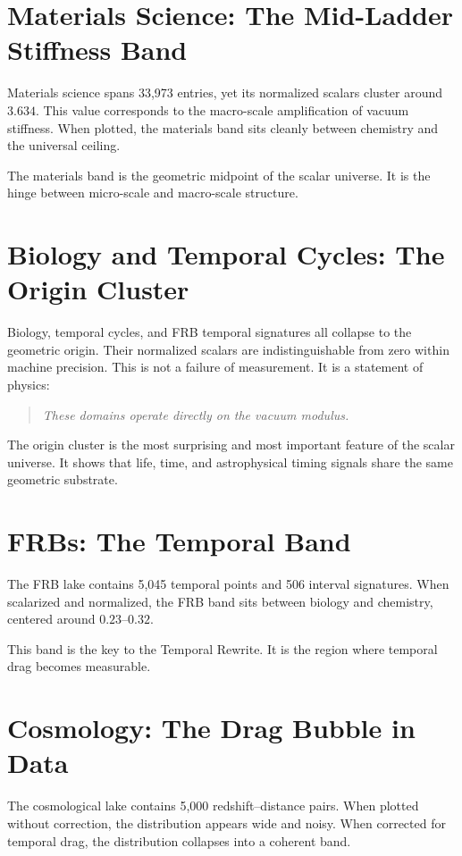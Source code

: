 \documentclass[11pt, letterpaper, openany]{book}
\begin{document}
\section*{Materials Science: The Mid-Ladder Stiffness Band}
Materials science spans 33,973 entries, yet its normalized scalars cluster around $3.634$. This value
corresponds to the macro-scale amplification of vacuum stiffness. When plotted, the materials band
sits cleanly between chemistry and the universal ceiling.

The materials band is the geometric midpoint of the scalar universe.  
It is the hinge between micro-scale and macro-scale structure.

\section*{Biology and Temporal Cycles: The Origin Cluster}
Biology, temporal cycles, and FRB temporal signatures all collapse to the geometric origin. Their
normalized scalars are indistinguishable from zero within machine precision. This is not a failure of
measurement. It is a statement of physics:

\begin{quote}
\textit{These domains operate directly on the vacuum modulus.}
\end{quote}

The origin cluster is the most surprising and most important feature of the scalar universe. It shows
that life, time, and astrophysical timing signals share the same geometric substrate.

\section*{FRBs: The Temporal Band}
The FRB lake contains 5,045 temporal points and 506 interval signatures. When scalarized and
normalized, the FRB band sits between biology and chemistry, centered around $0.23$–$0.32$.

This band is the key to the Temporal Rewrite.  
It is the region where temporal drag becomes measurable.

\section*{Cosmology: The Drag Bubble in Data}
The cosmological lake contains 5,000 redshift–distance pairs. When plotted without correction, the
distribution appears wide and noisy. When corrected for temporal drag, the distribution collapses
into a coherent band.
\end{document}
